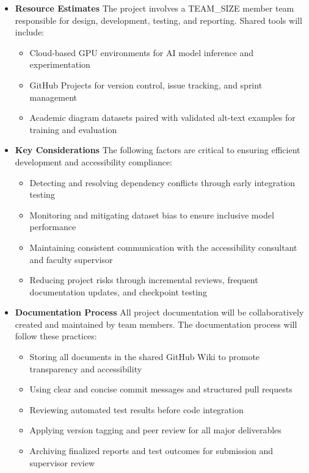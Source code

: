 \documentclass[12pt]{article}
\begin{document}
\begin{itemize}
  \item \textbf{Resource Estimates}
    The project involves a TEAM\_SIZE member team responsible for design,
    development, testing, and reporting. Shared tools will include:
    \begin{itemize}
        \item Cloud-based GPU environments for AI model inference and experimentation  
        \item GitHub Projects for version control, issue tracking, and sprint management  
        \item Academic diagram datasets paired with validated alt-text examples for training and evaluation  
    \end{itemize}

    \item \textbf{Key Considerations}  
    The following factors are critical to ensuring efficient development and accessibility compliance:
    \begin{itemize}
        \item Detecting and resolving dependency conflicts through early integration testing  
        \item Monitoring and mitigating dataset bias to ensure inclusive model performance  
        \item Maintaining consistent communication with the accessibility consultant and faculty supervisor  
        \item Reducing project risks through incremental reviews, frequent documentation updates, and checkpoint testing  
    \end{itemize}

    \item \textbf{Documentation Process}  
    All project documentation will be collaboratively created and maintained by team members.  
    The documentation process will follow these practices:
    \begin{itemize}
        \item Storing all documents in the shared GitHub Wiki to promote transparency and accessibility  
        \item Using clear and concise commit messages and structured pull requests  
        \item Reviewing automated test results before code integration  
        \item Applying version tagging and peer review for all major deliverables  
        \item Archiving finalized reports and test outcomes for submission and supervisor review  
    \end{itemize}
\end{itemize}
\end{document}
